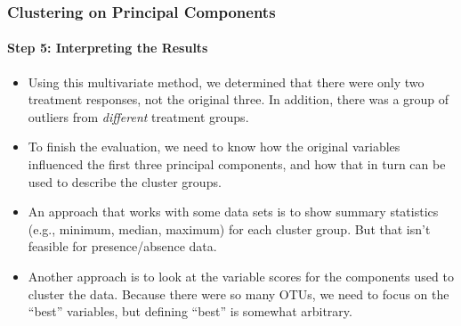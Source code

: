 \documentclass[10pt]{beamer}
\begin{document}
\begin{frame}[fragile]
\frametitle{Clustering on Principal Components}
\framesubtitle{Step 5: Interpreting the Results}

{\footnotesize
\begin{itemize}
\item Using this multivariate method, we determined that there were
  only two treatment responses, not the original three.  In addition,
  there was a group of outliers from {\em \color{blue} different}
  treatment groups.

\vspace*{1ex}  
\item To finish the evaluation, we need to know how the original
  variables influenced the first three principal components, and how
  that in turn can be used to describe the cluster groups.

\vspace*{1ex}  
\item An approach that works with some data sets is to show summary
  statistics (e.g., minimum, median, maximum) for each cluster
  group.  But that isn't feasible for presence/absence data.

\vspace*{1ex}  
\item Another approach is to look at the variable scores for the
  components used to cluster the data.  Because there were so many
  OTUs, we need to focus on the ``best'' variables, but defining
  ``best'' is somewhat arbitrary.

\end{itemize}
}
\end{frame}
\end{document}
